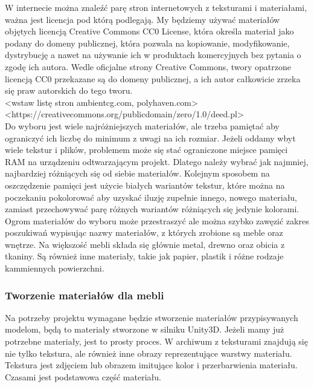 \documentclass{article} %
\begin{document}
            W internecie można znaleźć parę stron internetowych z teksturami i materiałami, ważna jest licencja pod którą podlegają. My będziemy używać materiałów objętych licencją Creative Commons CC0 License, która określa materiał jako podany do domeny publicznej, która pozwala na kopiowanie, modyfikowanie, dystrybucję a nawet na używanie ich w produktach komercyjnych bez pytania o zgodę ich autora. Wedle oficjalne strony Creative Commons, twory opatrzone licencją CC0 przekazane są do domeny publicznej, a ich autor całkowicie zrzeka się praw autorskich do tego tworu.
            \\
            
            <wstaw listę stron ambientcg.com, polyhaven.com> \\
            <https://creativecommons.org/publicdomain/zero/1.0/deed.pl>
            \\
            
            Do wyboru jest wiele najróżniejszych materiałów, ale trzeba pamiętać aby ograniczyć ich liczbę do minimum z uwagi na ich rozmiar. Jeżeli oddamy wbyt wiele tekstur i plików, problemem może się stać ograniczone miejsce pamięci RAM na urządzeniu odtwarzającym projekt. Dlatego należy wybrać jak najmniej, najbardziej różniących się od siebie materiałów. Kolejnym sposobem na oszczędzenie pamięci jest użycie białych wariantów tekstur, które można na poczekaniu pokolorować aby uzyskać iluzję zupełnie innego, nowego materiału, zamiast przechowywać parę różnych wariantów różniących się jedynie kolorami. 
            \\
            
            Ogrom materiałów do wyboru może przestraszyć ale można szybko zawęzić zakres poszukiwań wypisując nazwy materiałów, z których zrobione są meble oraz wnętrze. Na większość mebli składa się głównie metal, drewno oraz obicia z tkaniny. Są również inne materiały, takie jak papier, plastik i różne rodzaje kammiennych powierzchni.
            \\
            
        \subsubsection{Tworzenie materiałów dla mebli}
            Na potrzeby projektu wymagane będzie stworzenie materiałów przypisywanych modelom, będą to materiały stworzone w silniku Unity3D. Jeżeli mamy już potrzebne materiały, jest to prosty proces. W archiwum z teksturami znajdują się nie tylko tekstura, ale również inne obrazy reprezentujące warstwy materiału.         Tekstura jest zdjęciem lub obrazem imitujące kolor i przerbarwienia materiału. Czasami jest podstawowa część materiału.
            \\
            
\end{document}
